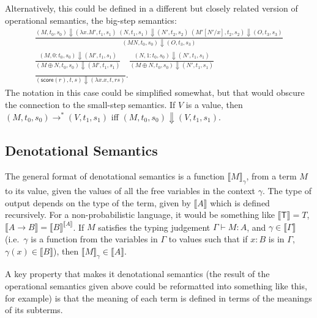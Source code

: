 \documentclass[titlepage]{article}
\newcommand{\tscore}{\mathsf{score}}
\newcommand{\denotation}[1]{\llbracket #1 \rrbracket}
\begin{document}
Alternatively, this could be defined in a different but closely related version of operational semantics, the big-step semantics:
\begin{multline*}
\frac{(M, t_0, s_0) \Downarrow (\lambda x. M', t_1, s_1) \; (N, t_1, s_1) \Downarrow (N', t_2, s_2) \; (M'[N'/x], t_2, s_2) \Downarrow (O, t_3, s_3)}{(M N, t_0, s_0) \Downarrow (O, t_3, s_3)} \\
\frac{(M, 0:t_0, s_0) \Downarrow (M', t_1, s_1)}{(M \oplus N, t_0, s_0) \Downarrow (M', t_1, s_1)} \quad
\frac{(N, 1:t_0, s_0) \Downarrow (N', t_1, s_1)}{(M \oplus N, t_0, s_0) \Downarrow (N', t_1, s_1)} \\
\frac{}{(\tscore(r), t, s) \Downarrow (\lambda x. x, t, rs)}.
\end{multline*}
The notation in this case could be simplified somewhat, but that would obscure the connection to the small-step semantics. If $V$ is a value, then $(M, t_0, s_0) \to^* (V, t_1, s_1)$ iff $(M, t_0, s_0) \Downarrow (V, t_1, s_1)$.

\subsection{Denotational Semantics}
The general format of denotational semantics is a function $\denotation M_\gamma$, from a term $M$ to its value, given the values of all the free variables in the context $\gamma$. The type of output depends on the type of the term, given by $\denotation A$ which is defined recursively. For a non-probabilistic language, it would be something like $\denotation{\mathsf T} = T$, $\denotation{A \to B} = \denotation B^{\denotation A}$.\cite{barendregt2013lambda} If $M$ satisfies the typing judgement $\Gamma \vdash M : A$, and $\gamma \in \denotation \Gamma$ (i.e.~$\gamma$ is a function from the variables in $\Gamma$ to values such that if $x:B$ is in $\Gamma$, $\gamma (x) \in \denotation B$), then $\denotation M_\gamma \in \denotation A$.

A key property that makes it denotational semantics (the result of the operational semantics given above could be reformatted into something like this, for example) is that the meaning of each term is defined in terms of the meanings of its subterms. \cite[\S 3.1]{MOSSES1990575}
\end{document}

